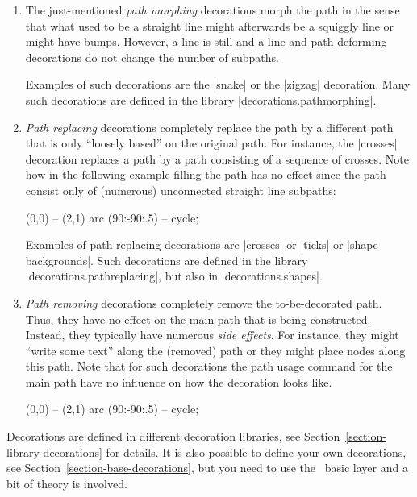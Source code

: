 \begin{enumerate}
\item The just-mentioned \emph{path morphing} decorations morph the
  path in the sense that what used to be a straight  line might
  afterwards be a squiggly line or might have bumps. However, a line
  is still and a line and path deforming decorations do not change
  the number of subpaths.

  Examples of such decorations are the |snake| or the |zigzag|
  decoration. Many such decorations are defined in the library
  |decorations.pathmorphing|.

\item \emph{Path replacing} decorations completely replace the
  path by a different path that is only ``loosely based'' on the
  original path. For instance, the |crosses| decoration replaces a path
  by a path consisting of a sequence of crosses. Note how in the
  following example filling the path has no effect since the path
  consist only of (numerous) unconnected straight line subpaths:
\begin{codeexample}[]
\tikz \fill [decorate,decoration={crosses}]
  [fill=blue!20,draw=blue,thick] (0,0) -- (2,1) arc (90:-90:.5) -- cycle;
\end{codeexample}

  Examples of path replacing decorations are |crosses| or |ticks| or
  |shape backgrounds|. Such decorations are defined in the library
  |decorations.pathreplacing|, but also in |decorations.shapes|.

\item \emph{Path removing} decorations completely remove the
  to-be-decorated path. Thus, they have no effect on the main path
  that is being constructed. Instead, they typically have numerous
  \emph{side  effects}. For instance, they might ``write some text''
  along the (removed) path or they might place nodes along this
  path. Note that for such decorations the path usage command for the
  main path have no influence on how the decoration looks like.

\begin{codeexample}[]
\tikz \fill [decorate,decoration={text along path,
               text=This is a text along a path. Note how the path is lost.}]
  [fill=blue!20,draw=blue,thick] (0,0) -- (2,1) arc (90:-90:.5) -- cycle;
\end{codeexample}
\end{enumerate}

Decorations are defined in different decoration libraries, see
Section~\ref{section-library-decorations} for details. It is also
possible to define your own decorations, see
Section~\ref{section-base-decorations}, but you need to use the
\pgfname\ basic layer and a bit of theory is involved.

